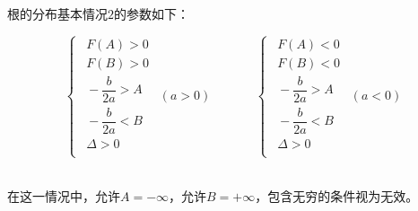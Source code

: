 \documentclass[UTF8]{ctexart}
\begin{document}
    根的分布基本情况$2$的参数如下：\vspace{3pt}
    \begin{large}
        \begin{equation*}
            \begin{cases}
                ~~F(A)>0\\[2mm]
                ~~F(B)>0\\[2mm]
                ~~-\dfrac{b}{2a}>A\\[4mm]
                ~~-\dfrac{b}{2a}<B\\[3mm]
                ~~\Delta>0\\[1mm]
            \end{cases}
            ~~(a>0)
            ~~~~~~~~~~~~~~~~
            \begin{cases}
                ~~F(A)<0\\[2mm]
                ~~F(B)<0\\[2mm]
                ~~-\dfrac{b}{2a}>A\\[4mm]
                ~~-\dfrac{b}{2a}<B\\[3mm]
                ~~\Delta>0\\[1mm]
            \end{cases}
            ~~(a<0)
        \end{equation*}
    \end{large}\\[1mm]
    在这一情况中，允许$A=-\infty$，允许$B=+\infty$，包含无穷的条件视为无效。

\newpage
\end{document}
